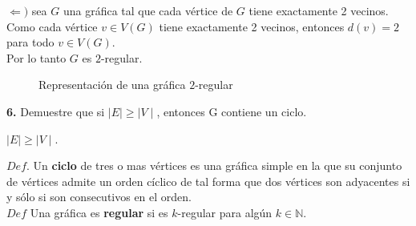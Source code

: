 \documentclass[12pt]{article}
\begin{document}
$\Longleftarrow)$ sea $G$ una gráfica tal que cada vértice de $G$ tiene exactamente 2 vecinos.\\

Como cada vértice $v \in V(G)$ tiene exactamente 2 vecinos, entonces $d(v) = 2$ para todo $v \in V(G)$.\\

Por lo tanto $G$ es $2$-regular.\\

\begin{figure}[h!]
    \centering
    \begin{minipage}{0.6\textwidth}
        \centering
        \caption{Representación de una gráfica $2$-regular}
    \end{minipage}
\end{figure}

%
%
\textbf{6.} Demuestre que si $\mid E \mid \geq\mid V \mid$, entonces G contiene un ciclo.

\begin{tcolorbox}[title=\textbf{Hipotesis}, colback=red!15!white, colframe=black!, breakable]
    $\mid E \mid \geq \mid V \mid$.
\end{tcolorbox}

\begin{tcolorbox}[title=\textbf{Definiciones}, colback=blue!15!white, colframe=black!]
    $Def$. Un \textbf{ciclo} de tres o mas vértices es una gráfica simple en la que su conjunto de
    vértices admite un orden cíclico de tal forma que dos vértices son adyacentes si y sólo si son consecutivos en el orden.\\

    $Def$ Una gráfica es \textbf{regular} si es $k$-regular para algún $k \in \mathbb{N}$.
\end{tcolorbox}
\end{document}
